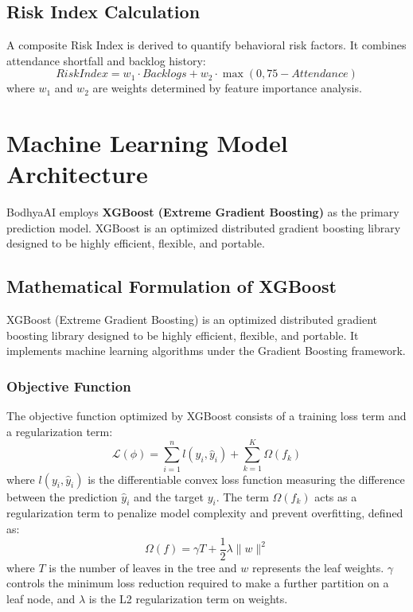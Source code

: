 \documentclass[12pt,a4paper]{report}
\begin{document}
\subsection{Risk Index Calculation}
A composite Risk Index is derived to quantify behavioral risk factors. It combines attendance shortfall and backlog history:
\[
RiskIndex = w_1 \cdot Backlogs + w_2 \cdot \max(0, 75 - Attendance)
\]
where $w_1$ and $w_2$ are weights determined by feature importance analysis.

\section{Machine Learning Model Architecture}

BodhyaAI employs \textbf{XGBoost (Extreme Gradient Boosting)} as the primary prediction model. XGBoost is an optimized distributed gradient boosting library designed to be highly efficient, flexible, and portable.

\subsection{Mathematical Formulation of XGBoost}
XGBoost (Extreme Gradient Boosting) is an optimized distributed gradient boosting library designed to be highly efficient, flexible, and portable. It implements machine learning algorithms under the Gradient Boosting framework.

\subsubsection{Objective Function}
The objective function optimized by XGBoost consists of a training loss term and a regularization term:
\begin{equation}
\mathcal{L}(\phi) = \sum_{i=1}^{n} l(y_i, \hat{y}_i) + \sum_{k=1}^{K} \Omega(f_k)
\label{eq:xgb_objective}
\end{equation}
where $l(y_i, \hat{y}_i)$ is the differentiable convex loss function measuring the difference between the prediction $\hat{y}_i$ and the target $y_i$. The term $\Omega(f_k)$ acts as a regularization term to penalize model complexity and prevent overfitting, defined as:
\begin{equation}
\Omega(f) = \gamma T + \frac{1}{2} \lambda \|w\|^2
\label{eq:xgb_regularization}
\end{equation}
where $T$ is the number of leaves in the tree and $w$ represents the leaf weights. $\gamma$ controls the minimum loss reduction required to make a further partition on a leaf node, and $\lambda$ is the L2 regularization term on weights.
\end{document}
